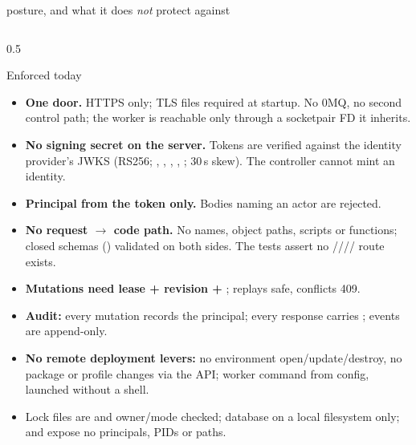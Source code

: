 \begin{frame}{\vtwo{} posture, and what it does \emph{not} protect against}
    \begin{columns}[T]
        \begin{column}{0.5\textwidth}
            \begin{block}{Enforced today}
                \scriptsize
                \begin{itemize}
                    \item \textbf{One door.} HTTPS only; TLS files required at startup. No 0MQ, no second
                          control path; the worker is reachable only through a socketpair FD it inherits.
                    \item \textbf{No signing secret on the server.} Tokens are verified against the identity
                          provider's JWKS (RS256; , , , , ; 30\,s skew).
                          The controller cannot mint an identity. 
                    \item \textbf{Principal from the token only.} Bodies naming an actor are rejected.
                    \item \textbf{No request $\to$ code path.} No names, object paths, scripts or functions;
                          closed schemas () validated on both sides. The tests
                          assert no //// route
                          exists. 
                    \item \textbf{Mutations need lease + revision + }; replays safe, conflicts 409.
                    \item \textbf{Audit:} every mutation records the principal; every response carries
                          ; events are append-only.
                    \item \textbf{No remote deployment levers:} no environment open/update/destroy, no package
                          or profile changes via the API; worker command from config, launched without a shell.
                    \item Lock files are  and owner/mode checked; database on a local filesystem only;
                           and  expose no principals, PIDs or paths.
                \end{itemize}

\end{block}
\end{column}
\end{columns}
\end{frame}
